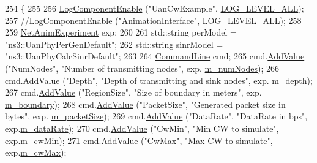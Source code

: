 \begin{DoxyCode}
254 \{
255 
256   \hyperlink{namespacens3_adc4ef4f00bb2f5f4edae67fc3bc27f20}{LogComponentEnable} (\textcolor{stringliteral}{"UanCwExample"}, \hyperlink{namespacens3_aa6464a4d69551a9cc968e17a65f39bdba022b1237a4fd1b08d034471df3c58586}{LOG\_LEVEL\_ALL});
257   \textcolor{comment}{//LogComponentEnable ("AnimationInterface", LOG\_LEVEL\_ALL);}
258 
259   \hyperlink{classNetAnimExperiment}{NetAnimExperiment} exp;
260 
261   std::string perModel = \textcolor{stringliteral}{"ns3::UanPhyPerGenDefault"};
262   std::string sinrModel = \textcolor{stringliteral}{"ns3::UanPhyCalcSinrDefault"};
263 
264   \hyperlink{classns3_1_1CommandLine}{CommandLine} cmd;
265   cmd.\hyperlink{classns3_1_1CommandLine_addcfb546c7ad4c8bd0965654d55beb8e}{AddValue} (\textcolor{stringliteral}{"NumNodes"}, \textcolor{stringliteral}{"Number of transmitting nodes"}, exp.
      \hyperlink{classNetAnimExperiment_a829363fc981b850401bc71674534c447}{m\_numNodes});
266   cmd.\hyperlink{classns3_1_1CommandLine_addcfb546c7ad4c8bd0965654d55beb8e}{AddValue} (\textcolor{stringliteral}{"Depth"}, \textcolor{stringliteral}{"Depth of transmitting and sink nodes"}, exp.
      \hyperlink{classNetAnimExperiment_a6b6f1fbd47ec60dd032ae97f8962dea1}{m\_depth});
267   cmd.\hyperlink{classns3_1_1CommandLine_addcfb546c7ad4c8bd0965654d55beb8e}{AddValue} (\textcolor{stringliteral}{"RegionSize"}, \textcolor{stringliteral}{"Size of boundary in meters"}, exp.
      \hyperlink{classNetAnimExperiment_a172cb08bfa569ac31ad597a6770a467d}{m\_boundary});
268   cmd.\hyperlink{classns3_1_1CommandLine_addcfb546c7ad4c8bd0965654d55beb8e}{AddValue} (\textcolor{stringliteral}{"PacketSize"}, \textcolor{stringliteral}{"Generated packet size in bytes"}, exp.
      \hyperlink{classNetAnimExperiment_a8fa7c7d678fb0721374708aad5537510}{m\_packetSize});
269   cmd.\hyperlink{classns3_1_1CommandLine_addcfb546c7ad4c8bd0965654d55beb8e}{AddValue} (\textcolor{stringliteral}{"DataRate"}, \textcolor{stringliteral}{"DataRate in bps"}, exp.\hyperlink{classNetAnimExperiment_a7998af435f1259ef914a8e434f76a0c0}{m\_dataRate});
270   cmd.\hyperlink{classns3_1_1CommandLine_addcfb546c7ad4c8bd0965654d55beb8e}{AddValue} (\textcolor{stringliteral}{"CwMin"}, \textcolor{stringliteral}{"Min CW to simulate"}, exp.\hyperlink{classNetAnimExperiment_a2d4b4380bbc3962d37415236ebc46f64}{m\_cwMin});
271   cmd.\hyperlink{classns3_1_1CommandLine_addcfb546c7ad4c8bd0965654d55beb8e}{AddValue} (\textcolor{stringliteral}{"CwMax"}, \textcolor{stringliteral}{"Max CW to simulate"}, exp.\hyperlink{classNetAnimExperiment_a36377073bd491b2213fd752da30e9362}{m\_cwMax});

\end{DoxyCode}
